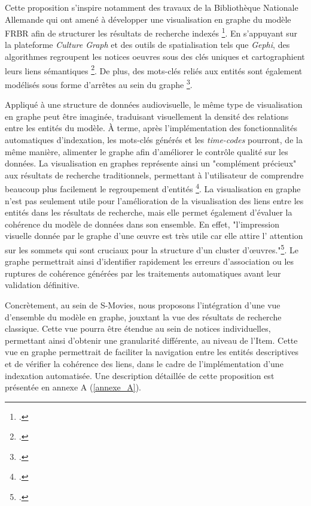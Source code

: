Cette proposition s'inspire notamment des travaux de la Bibliothèque Nationale Allemande qui ont amené à développer une visualisation en graphe du modèle \gls{FRBR} afin de structurer les résultats de recherche indexés \footcite{zotero-item-749}. En s'appuyant sur la plateforme \textit{Culture Graph} et des outils de spatialisation tels que \textit{Gephi}, des algorithmes regroupent les notices \gls{oeuvre}s sous des clés uniques et cartographient leurs liens sémantiques \footcite{zotero-item-749}. De plus, des mots-clés reliés aux entités sont également modélisés sous forme d'arrêtes au sein du graphe \footcite{zotero-item-749}. 

Appliqué à une structure de données audiovisuelle, le même type de visualisation en graphe peut être imaginée, traduisant visuellement la densité des relations entre les entités du modèle. À terme, après l'implémentation des fonctionnalités automatiques d'indexation, les mots-clés générés et les \textit{time-codes} pourront, de la même manière, alimenter le graphe afin d'améliorer le contrôle qualité sur les données. La visualisation en graphes représente ainsi un "complément précieux" aux résultats de recherche traditionnels, permettant à l'utilisateur de comprendre beaucoup plus facilement le regroupement d'entités \footcite{zotero-item-749}. La visualisation en graphe n'est pas seulement utile pour l'amélioration de la visualisation des liens entre les entités dans les résultats de recherche, mais elle permet également d'évaluer la cohérence du modèle de données dans son ensemble. En effet, "l’impression visuelle donnée par le graphe d’une œuvre est très utile car elle attire l’ attention sur les sommets qui sont cruciaux pour la structure d’un cluster d’œuvres."\footcite{zotero-item-749}. Le graphe permettrait ainsi d'identifier rapidement les erreurs d'association ou les ruptures de cohérence générées par les traitements automatiques avant leur validation définitive. 

Concrètement, au sein de S-Movies, nous proposons l'intégration d'une vue d'ensemble du modèle en graphe, jouxtant la vue des résultats de recherche classique. Cette vue pourra être étendue au sein de notices individuelles, permettant ainsi d'obtenir une granularité différente, au niveau de l'Item. Cette vue en graphe permettrait de faciliter la navigation entre les entités descriptives et de vérifier la cohérence des liens, dans le cadre de l'implémentation d'une indexation automatisée. Une description détaillée de cette proposition est présentée en annexe A (\ref{annexe_A}).


